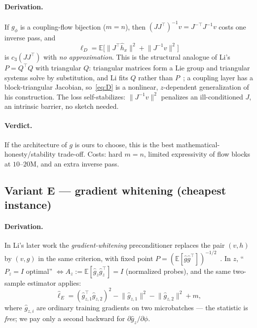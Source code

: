 \documentclass[11pt]{article}
\theoremstyle{plain}
\theoremstyle{definition}
\theoremstyle{remark}
\newcommand{\E}{\mathbb{E}}
\newcommand{\norm}[1]{\lVert #1 \rVert}
\begin{document}
\paragraph{Derivation.} If $g_\phi$ is a coupling-flow bijection ($m=n$), then
$(JJ^{\!\top})^{-1}v=J^{-\top}J^{-1}v$ costs one inverse pass, and
\begin{equation}
\label{eq:D}
  \ell_D=\E\big[\norm{J^{\!\top}\hat h_x}^2+\norm{J^{-1}v}^2\big]
\end{equation}
is $c_3(JJ^{\!\top})$ with \emph{no approximation}. This is the structural analogue of Li's
$P=Q^{\!\top}Q$ with triangular $Q$: triangular matrices form a Lie group and triangular
systems solve by substitution, and Li fits $Q$ rather than $P$~\cite{li2015}; a coupling
layer has a block-triangular Jacobian, so~\eqref{eq:D} is a nonlinear, $z$-dependent
generalization of his construction. The loss self-stabilizes: $\norm{J^{-1}v}^2$ penalizes
an ill-conditioned $J$, an intrinsic barrier, no sketch needed.

\paragraph{Verdict.} If the architecture of $g$ is ours to choose, this is the best
mathematical-honesty/stability trade-off. Costs: hard $m=n$, limited expressivity of flow
blocks at $10$--$20$M, and an extra inverse pass.

\subsection{Variant E --- gradient whitening (cheapest instance)}
\label{sub:E}
\paragraph{Derivation.} In Li's later work the \emph{gradient-whitening} preconditioner
replaces the pair $(v,h)$ by $(v,g)$ in the same criterion, with fixed point
$P=(\E[\hat g\hat g^{\!\top}])^{-1/2}$~\cite{li2024,pooladzandi2024}. In $z$, ``$P_z=I$
optimal'' $\Leftrightarrow A_z:=\E[\hat g_z\hat g_z^{\!\top}]=I$ (normalized probes), and the
same two-sample estimator applies:
\begin{equation}
\label{eq:E}
  \hat\ell_E=(\hat g_{z,1}^{\!\top}\hat g_{z,2})^2-\norm{\hat g_{z,1}}^2-\norm{\hat g_{z,2}}^2+m ,
\end{equation}
where $\hat g_{z,i}$ are ordinary training gradients on two microbatches --- the statistic
is \emph{free}; we pay only a second backward for $\partial\hat g_z/\partial\phi$.
\end{document}
